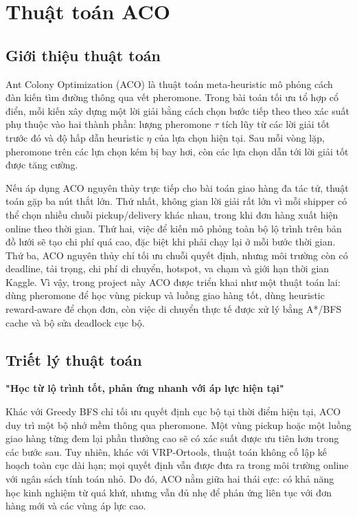 \documentclass[conference]{IEEEtran}
\begin{document}
\section{Thuật toán ACO}
\subsection{Giới thiệu thuật toán}
Ant Colony Optimization (ACO) là thuật toán meta-heuristic mô phỏng cách đàn kiến tìm đường thông qua vết pheromone. Trong bài toán tối ưu tổ hợp cổ điển, mỗi kiến xây dựng một lời giải bằng cách chọn bước tiếp theo theo xác suất phụ thuộc vào hai thành phần: lượng pheromone $\tau$ tích lũy từ các lời giải tốt trước đó và độ hấp dẫn heuristic $\eta$ của lựa chọn hiện tại. Sau mỗi vòng lặp, pheromone trên các lựa chọn kém bị bay hơi, còn các lựa chọn dẫn tới lời giải tốt được tăng cường.

Nếu áp dụng ACO nguyên thủy trực tiếp cho bài toán giao hàng đa tác tử, thuật toán gặp ba nút thắt lớn. Thứ nhất, không gian lời giải rất lớn vì mỗi shipper có thể chọn nhiều chuỗi pickup/delivery khác nhau, trong khi đơn hàng xuất hiện online theo thời gian. Thứ hai, việc để kiến mô phỏng toàn bộ lộ trình trên bản đồ lưới sẽ tạo chi phí quá cao, đặc biệt khi phải chạy lại ở mỗi bước thời gian. Thứ ba, ACO nguyên thủy chỉ tối ưu chuỗi quyết định, nhưng môi trường còn có deadline, tải trọng, chi phí di chuyển, hotspot, va chạm và giới hạn thời gian Kaggle. Vì vậy, trong project này ACO được triển khai như một thuật toán lai: dùng pheromone để học vùng pickup và luồng giao hàng tốt, dùng heuristic reward-aware để chọn đơn, còn việc di chuyển thực tế được xử lý bằng A*/BFS cache và bộ sửa deadlock cục bộ.

\subsection{Triết lý thuật toán}
\begin{center}
    \textbf{"Học từ lộ trình tốt, phản ứng nhanh với áp lực hiện tại"}
\end{center}

Khác với Greedy BFS chỉ tối ưu quyết định cục bộ tại thời điểm hiện tại, ACO duy trì một bộ nhớ mềm thông qua pheromone. Một vùng pickup hoặc một luồng giao hàng từng đem lại phần thưởng cao sẽ có xác suất được ưu tiên hơn trong các bước sau. Tuy nhiên, khác với VRP-Ortools, thuật toán không cố lập kế hoạch toàn cục dài hạn; mọi quyết định vẫn được đưa ra trong môi trường online với ngân sách tính toán nhỏ. Do đó, ACO nằm giữa hai thái cực: có khả năng học kinh nghiệm từ quá khứ, nhưng vẫn đủ nhẹ để phản ứng liên tục với đơn hàng mới và các vùng áp lực cao.
\end{document}
